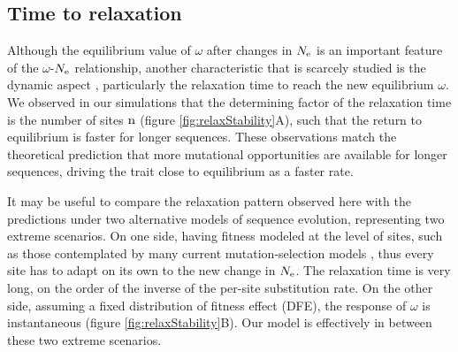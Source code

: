 \documentclass{MBE}%
\begin{document}
\subsection*{Time to relaxation}

Although the equilibrium value of $\omega$ after changes in $N_{\mathrm{e}}$ is an important feature of the $\omega$-$N_{\mathrm{e}}$ relationship, another characteristic that is scarcely studied is the dynamic aspect \citep{Jones2016}, particularly the relaxation time to reach the new equilibrium $\omega$.
We observed in our simulations that the determining factor of the relaxation time is the number of sites $\text{n}$ (figure \ref{fig:relaxStability}A), such that the return to equilibrium is faster for longer sequences.
These observations match the theoretical prediction that more mutational opportunities are available for longer sequences, driving the trait close to equilibrium as a faster rate.

It may be useful to compare the relaxation pattern observed here with the predictions under two alternative models of sequence evolution, representing two extreme scenarios.
On one side, having fitness modeled at the level of sites, such as those contemplated by many current mutation-selection models \citep{Halpern1998, Rodrigue2010, Tamuri2012}, thus every site has to adapt on its own to the new change in $N_{\mathrm{e}}$.
The relaxation time is very long, on the order of the inverse of the per-site substitution rate.
On the other side, assuming a fixed distribution of fitness effect (DFE), the response of $\omega$ is instantaneous (figure \ref{fig:relaxStability}B).
Our model is effectively in between these two extreme scenarios.
\end{document}
